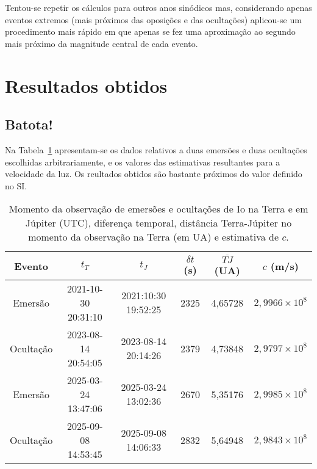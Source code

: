 \documentclass[]{article}
\begin{document}
Tentou-se repetir os cálculos para outros anos sinódicos mas, considerando
apenas eventos extremos (mais próximos das oposições e das ocultações)
aplicou-se um procedimento mais rápido em que apenas se fez uma
aproximação ao segundo mais próximo da magnitude central de cada evento.

\section{Resultados obtidos}
\subsection{Batota!}
Na Tabela~\ref{tab:aa} apresentam-se os dados relativos a duas emersões e duas
ocultações escolhidas arbitrariamente, e os valores das estimativas resultantes
para a velocidade da luz.  Os reultados obtidos são bastante próximos do valor
definido no SI.
\begin{table}[htb]
  \begin{center}
    \begin{tabular}{cccccc}
      \hline
      Evento & $t_T$ & $t_J$ & $\delta t$ (s) & $\overline{TJ}$ (UA) & $c$ (m/s) \\
      \hline
      Emersão  & 2021-10-30 20:31:10 & 2021:10:30 19:52:25 & 2325 & 4,65728 & $2,9966\times10^8$\\
      Ocultação& 2023-08-14 20:54:05 & 2023-08-14 20:14:26 & 2379 & 4,73848 & $2,9797\times10^8$\\
      Emersão  & 2025-03-24 13:47:06 & 2025-03-24 13:02:36 & 2670 & 5,35176 & $2,9985\times10^8$\\
      Ocultação& 2025-09-08 14:53:45 & 2025-09-08 14:06:33 & 2832 & 5,64948 & $2,9843\times10^8$\\
      \hline
    \end{tabular}
  \end{center}
  \caption{\label{tab:aa}Momento da observação de emersões e ocultações de Io na
  Terra e em Júpiter (UTC), diferença temporal, distância Terra-Júpiter no
momento da observação na Terra (em UA) e estimativa de $c$.}
\end{table}
\end{document}
